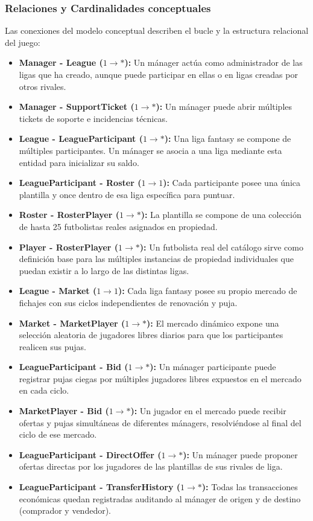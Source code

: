 \subsubsection{Relaciones y Cardinalidades conceptuales}
Las conexiones del modelo conceptual describen el bucle y la estructura relacional del juego:
\begin{itemize}
    \item \textbf{Manager - League ($1 \rightarrow *$):} Un mánager actúa como administrador de las ligas que ha creado, aunque puede participar en ellas o en ligas creadas por otros rivales.
    \item \textbf{Manager - SupportTicket ($1 \rightarrow *$):} Un mánager puede abrir múltiples tickets de soporte e incidencias técnicas.
    \item \textbf{League - LeagueParticipant ($1 \rightarrow *$):} Una liga fantasy se compone de múltiples participantes. Un mánager se asocia a una liga mediante esta entidad para inicializar su saldo.
    \item \textbf{LeagueParticipant - Roster ($1 \rightarrow 1$):} Cada participante posee una única plantilla y once dentro de esa liga específica para puntuar.
    \item \textbf{Roster - RosterPlayer ($1 \rightarrow *$):} La plantilla se compone de una colección de hasta 25 futbolistas reales asignados en propiedad.
    \item \textbf{Player - RosterPlayer ($1 \rightarrow *$):} Un futbolista real del catálogo sirve como definición base para las múltiples instancias de propiedad individuales que puedan existir a lo largo de las distintas ligas.
    \item \textbf{League - Market ($1 \rightarrow 1$):} Cada liga fantasy posee su propio mercado de fichajes con sus ciclos independientes de renovación y puja.
    \item \textbf{Market - MarketPlayer ($1 \rightarrow *$):} El mercado dinámico expone una selección aleatoria de jugadores libres diarios para que los participantes realicen sus pujas.
    \item \textbf{LeagueParticipant - Bid ($1 \rightarrow *$):} Un mánager participante puede registrar pujas ciegas por múltiples jugadores libres expuestos en el mercado en cada ciclo.
    \item \textbf{MarketPlayer - Bid ($1 \rightarrow *$):} Un jugador en el mercado puede recibir ofertas y pujas simultáneas de diferentes mánagers, resolviéndose al final del ciclo de ese mercado.
    \item \textbf{LeagueParticipant - DirectOffer ($1 \rightarrow *$):} Un mánager puede proponer ofertas directas por los jugadores de las plantillas de sus rivales de liga.
    \item \textbf{LeagueParticipant - TransferHistory ($1 \rightarrow *$):} Todas las transacciones económicas quedan registradas auditando al mánager de origen y de destino (comprador y vendedor).
\end{itemize}

